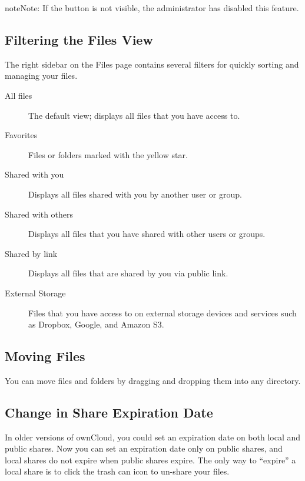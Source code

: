 \documentclass[letterpaper,10pt,english]{sphinxmanual}
\begin{document}
\begin{notice}{note}{Note:}
If the  button is not visible, the administrator has
disabled this feature.
\end{notice}


\subsection{Filtering the Files View}
\label{files/access_webgui:filtering-the-files-view}
The right sidebar on the Files page contains several filters for quickly sorting
and managing your files.
\begin{description}
\item[{All files}] \leavevmode
The default view; displays all files that you have access to.

\item[{Favorites}] \leavevmode
Files or folders marked with the yellow star.

\item[{Shared with you}] \leavevmode
Displays all files shared with you by another user or group.

\item[{Shared with others}] \leavevmode
Displays all files that you have shared with other users or groups.

\item[{Shared by link}] \leavevmode
Displays all files that are shared by you via public link.

\item[{External Storage}] \leavevmode
Files that you have access to on external storage devices and services such
as Dropbox, Google, and Amazon S3.

\end{description}


\subsection{Moving Files}
\label{files/access_webgui:moving-files}
You can move files and folders by dragging and dropping them into any directory.


\subsection{Change in Share Expiration Date}
\label{files/access_webgui:change-in-share-expiration-date}
In older versions of ownCloud, you could set an expiration date on both local
and public shares. Now you can set an expiration date only on public shares,
and local shares do not expire when public shares expire. The only way to
``expire'' a local share is to click the trash can icon to un-share your files.
\end{document}
